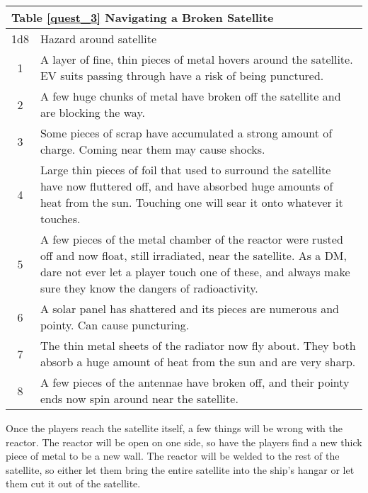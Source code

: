 \documentclass[a4paper]{article}
\begin{document}
\begin{tabular}[t]{| c | p{12.5cm} |}
\toprule
\multicolumn{2}{|l|}{Table \ref{quest_3} Navigating a Broken Satellite} \\
\midrule
1d8 & Hazard around satellite \\
\midrule
1 & A layer of fine, thin pieces of metal hovers around the satellite. EV suits passing through have a risk of being punctured. \\
2 & A few huge chunks of metal have broken off the satellite and are blocking the way. \\
3 & Some pieces of scrap have accumulated a strong amount of charge. Coming near them may cause shocks. \\
4 & Large thin pieces of foil that used to surround the satellite have now fluttered off, and have absorbed huge amounts of heat from the sun. Touching one will sear it onto whatever it touches. \\
5 & A few pieces of the metal chamber of the reactor were rusted off and now float, still irradiated, near the satellite. As a DM, dare not ever let a player touch one of these, and always make sure they know the dangers of radioactivity. \\
6 & A solar panel has shattered and its pieces are numerous and pointy. Can cause puncturing. \\
7 & The thin metal sheets of the radiator now fly about. They both absorb a huge amount of heat from the sun and are very sharp. \\
8 & A few pieces of the antennae have broken off, and their pointy ends now spin around near the satellite. \\
\bottomrule
\end{tabular}

\vspace{0.2cm}
Once the players reach the satellite itself, a few things will be wrong with the reactor. The reactor will be open on one side, so have the players find a new thick piece of metal to be a new wall. The reactor will be welded to the rest of the satellite, so either let them bring the entire satellite into the ship's hangar or let them cut it out of the satellite.
\end{document}

